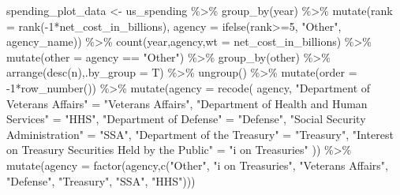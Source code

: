 \documentclass[
  letterpaper,
]{book}
\newenvironment{Shaded}{\begin{snugshade}}{\end{snugshade}}
\newcommand{\AttributeTok}[1]{\textcolor[rgb]{0.40,0.45,0.13}{#1}}
\newcommand{\DecValTok}[1]{\textcolor[rgb]{0.68,0.00,0.00}{#1}}
\newcommand{\FunctionTok}[1]{\textcolor[rgb]{0.28,0.35,0.67}{#1}}
\newcommand{\NormalTok}[1]{\textcolor[rgb]{0.00,0.23,0.31}{#1}}
\newcommand{\OtherTok}[1]{\textcolor[rgb]{0.00,0.23,0.31}{#1}}
\newcommand{\SpecialCharTok}[1]{\textcolor[rgb]{0.37,0.37,0.37}{#1}}
\newcommand{\StringTok}[1]{\textcolor[rgb]{0.13,0.47,0.30}{#1}}
\begin{document}
\begin{Shaded}
\begin{Highlighting}[]
\NormalTok{spending\_plot\_data }\OtherTok{\textless{}{-}}\NormalTok{ us\_spending }\SpecialCharTok{\%\textgreater{}\%} \FunctionTok{group\_by}\NormalTok{(year) }\SpecialCharTok{\%\textgreater{}\%} \FunctionTok{mutate}\NormalTok{(}\AttributeTok{rank =} \FunctionTok{rank}\NormalTok{(}\SpecialCharTok{{-}}\DecValTok{1}\SpecialCharTok{*}\NormalTok{net\_cost\_in\_billions), }\AttributeTok{agency =} \FunctionTok{ifelse}\NormalTok{(rank}\SpecialCharTok{\textgreater{}=}\DecValTok{5}\NormalTok{, }\StringTok{"Other"}\NormalTok{, agency\_name)) }\SpecialCharTok{\%\textgreater{}\%} \FunctionTok{count}\NormalTok{(year,agency,}\AttributeTok{wt =}\NormalTok{ net\_cost\_in\_billions) }\SpecialCharTok{\%\textgreater{}\%}
  \FunctionTok{mutate}\NormalTok{(}\AttributeTok{other =}\NormalTok{ agency }\SpecialCharTok{==} \StringTok{"Other"}\NormalTok{) }\SpecialCharTok{\%\textgreater{}\%}
  \FunctionTok{group\_by}\NormalTok{(other) }\SpecialCharTok{\%\textgreater{}\%}
  \FunctionTok{arrange}\NormalTok{(}\FunctionTok{desc}\NormalTok{(n),}\AttributeTok{.by\_group =}\NormalTok{ T) }\SpecialCharTok{\%\textgreater{}\%}
  \FunctionTok{ungroup}\NormalTok{() }\SpecialCharTok{\%\textgreater{}\%}
  \FunctionTok{mutate}\NormalTok{(}\AttributeTok{order =} \SpecialCharTok{{-}}\DecValTok{1}\SpecialCharTok{*}\FunctionTok{row\_number}\NormalTok{()) }\SpecialCharTok{\%\textgreater{}\%}
  \FunctionTok{mutate}\NormalTok{(}\AttributeTok{agency =} \FunctionTok{recode}\NormalTok{( agency,}
\StringTok{"Department of Veterans Affairs"} \OtherTok{=} \StringTok{"Veterans Affairs"}\NormalTok{,}
\StringTok{"Department of Health and Human Services"} \OtherTok{=} \StringTok{"HHS"}\NormalTok{,}
\StringTok{"Department of Defense"} \OtherTok{=} \StringTok{"Defense"}\NormalTok{,}
\StringTok{"Social Security Administration"} \OtherTok{=} \StringTok{"SSA"}\NormalTok{,}
\StringTok{"Department of the Treasury"} \OtherTok{=} \StringTok{"Treasury"}\NormalTok{,}
\StringTok{"Interest on Treasury Securities Held by the Public"} \OtherTok{=} \StringTok{"i on Treasuries"}
\NormalTok{)) }\SpecialCharTok{\%\textgreater{}\%} \FunctionTok{mutate}\NormalTok{(}\AttributeTok{agency =} \FunctionTok{factor}\NormalTok{(agency,}\FunctionTok{c}\NormalTok{(}\StringTok{"Other"}\NormalTok{, }\StringTok{"i on Treasuries"}\NormalTok{, }\StringTok{"Veterans Affairs"}\NormalTok{, }\StringTok{"Defense"}\NormalTok{, }\StringTok{"Treasury"}\NormalTok{, }\StringTok{"SSA"}\NormalTok{, }\StringTok{"HHS"}\NormalTok{)))}
\end{Highlighting}
\end{Shaded}
\end{document}
